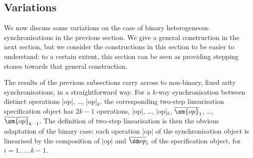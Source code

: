 \subsection{Variations}
\label{ssec:relating-variations}

We now discuss some variations on the case of binary heterogeneous
synchronisations in the previous section.  We give a general construction in
the next section, but we consider the constructions in this section to be
easier to understand: to a certain extent, this section can be seen as
providing stepping stones towards that general construction. 

The results of the previous subsections carry across to non-binary, fixed
arity synchronisations, in a straightforward way.  For a $k$-way
synchronisation between distinct operations |op|, \ldots, |op|$_k$, the
corresponding two-step linearisation specification object has $2k-1$
operations, |op|, \ldots, |op|$_k$, $\overline{\sm{op}}_1$, \ldots,
$\overline{\sm{op}}_{k-1}$.  The definition of two-step linearisation is then
the obvious adaptation of the binary case: each operation |op| of the
synchronisation object is linearised by the composition of |op| and
$\overline{\op}_i$ of the specification object, for $i = 1, \ldots, k-1$.

